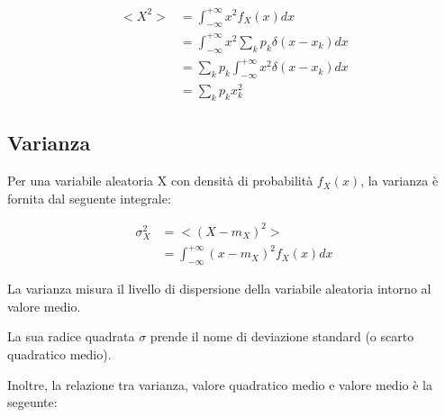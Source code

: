 {
    \Large 
    \begin{equation}
        \begin{split}
            <X^{2}> 
            &= 
            \int_{-\infty}^{+\infty}
            x^{2} f_X (x) dx 
            \\ 
            &= 
            \int_{-\infty}^{+\infty}
            x^{2} 
            \sum_{k} 
            p_k 
            \delta(x - x_k)
            dx 
            \\ 
            &= 
            \sum_{k} 
            p_k
            \int_{-\infty}^{+\infty}
            x^{2}  
            \delta(x - x_k)
            dx
            \\ 
            &= 
            \sum_{k}
            p_k 
            x_k ^{2}
        \end{split}
    \end{equation}
}

\subsection{Varianza} 

Per una variabile aleatoria X con densità di probabilità $f_X (x)$, 
la varianza è fornita dal seguente integrale: 

{
    \Large 
    \begin{equation}
        \begin{split}
            \sigma_X ^{2}    
            &= 
            <(X - m_X) ^{2} >
            \\ 
            &= 
            \int_{-\infty}^{+\infty}
            (x - m_X) ^{2}
            f_X (x) dx 
        \end{split}
    \end{equation}
}

La varianza misura il livello di dispersione della variabile aleatoria intorno al valore medio. \newline 

La sua radice quadrata $\sigma$ prende il nome di deviazione standard (o scarto quadratico medio). \newline 

Inoltre, la relazione tra varianza, valore quadratico medio e valore medio è la segeunte: 


